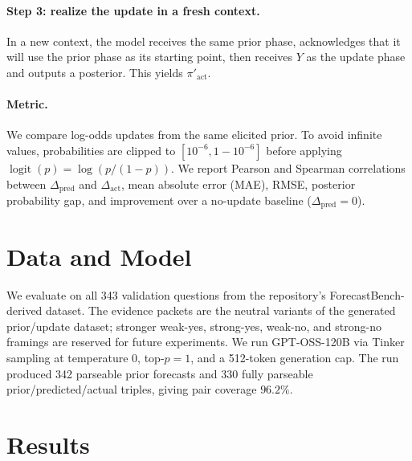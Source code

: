 \documentclass[11pt]{article}
\newcommand{\logit}{\operatorname{logit}}
\newcommand{\pred}{\mathrm{pred}}
\newcommand{\act}{\mathrm{act}}
\begin{document}
\paragraph{Step 3: realize the update in a fresh context.}
In a new context, the model receives the same prior phase, acknowledges that it
will use the prior phase as its starting point, then receives $Y$ as the update
phase and outputs a posterior. This yields $\pi'_{\act}$.

\paragraph{Metric.}
We compare log-odds updates from the same elicited prior. To avoid infinite
values, probabilities are clipped to $[10^{-6},1-10^{-6}]$ before applying
$\logit(p)=\log(p/(1-p))$. We report Pearson and Spearman correlations between
$\Delta_{\pred}$ and $\Delta_{\act}$, mean absolute error (MAE), RMSE, posterior
probability gap, and improvement over a no-update baseline
($\Delta_{\pred}=0$).

\section{Data and Model}

We evaluate on all 343 validation questions from the repository's
ForecastBench-derived dataset. The evidence packets are the neutral variants of
the generated prior/update dataset; stronger weak-yes, strong-yes, weak-no, and
strong-no framings are reserved for future experiments. We run GPT-OSS-120B via
Tinker sampling at temperature $0$, top-$p=1$, and a 512-token generation cap.
The run produced 342 parseable prior forecasts and 330 fully parseable
prior/predicted/actual triples, giving pair coverage $96.2\%$.

\section{Results}
\end{document}
